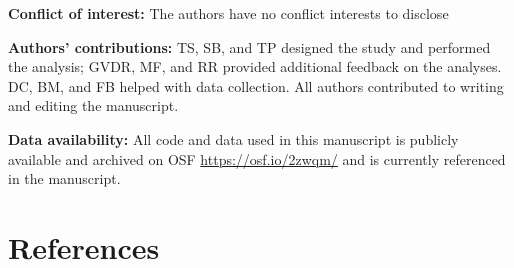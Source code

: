 \documentclass[10pt,oneside]{article}
\begin{document}
\textbf{Conflict of interest:} The authors have no conflict interests to
disclose

\textbf{Authors' contributions:} TS, SB, and TP designed the study and
performed the analysis; GVDR, MF, and RR provided additional feedback on
the analyses. DC, BM, and FB helped with data collection. All authors
contributed to writing and editing the manuscript.

\textbf{Data availability:} All code and data used in this manuscript is
publicly available and archived on OSF \url{https://osf.io/2zwqm/} and
is currently referenced in the manuscript.

\hypertarget{references}{%
\section*{References}\label{references}}
\end{document}
